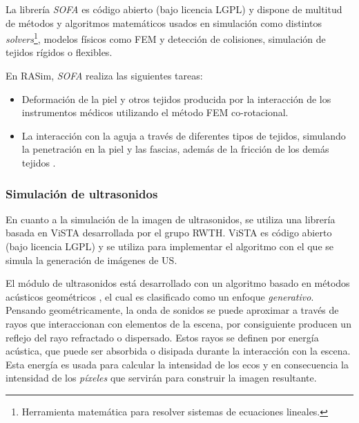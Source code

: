 La librería \emph{SOFA} es código abierto (bajo licencia \ac{LGPL}) y dispone de multitud de métodos y algoritmos matemáticos usados en simulación como distintos \emph{solvers}\footnote{Herramienta matemática para resolver sistemas de ecuaciones lineales.}, modelos físicos como \ac{FEM} y detección de colisiones, simulación de tejidos rígidos o flexibles.

En \ac{RASim}, \emph{SOFA} realiza las siguientes tareas:
\begin{itemize}
    \item Deformación de la piel y otros tejidos producida por la interacción de los instrumentos médicos utilizando el método \ac{FEM} co-rotacional.
    \item La interacción con la aguja a través de diferentes tipos de tejidos, simulando la penetración en la piel y las fascias, además de la fricción de los demás tejidos \cite{needleinsertion}.
    
\end{itemize}

\subsubsection{Simulación de ultrasonidos} 

En cuanto a la simulación de la imagen de ultrasonidos, se utiliza una librería basada en \ac{ViSTA} desarrollada por el grupo \ac{RWTH}. \ac{ViSTA} es código abierto (bajo licencia \ac{LGPL}) y se utiliza para implementar el algoritmo con el que se simula la generación de imágenes de \ac{US}.

El módulo de ultrasonidos está desarrollado con un algoritmo basado en métodos acústicos geométricos \cite{Law2015}, el cual es clasificado como un enfoque \emph{generativo}. Pensando geométricamente, la onda de sonidos se puede aproximar a través de rayos que interaccionan con elementos de la escena, por consiguiente producen un reflejo del rayo refractado o dispersado. Estos rayos se definen por energía acústica, que puede ser absorbida o disipada durante la interacción con la escena. Esta energía es usada para calcular la intensidad de los ecos y en consecuencia la intensidad de los \emph{píxeles} que servirán para construir la imagen resultante.

